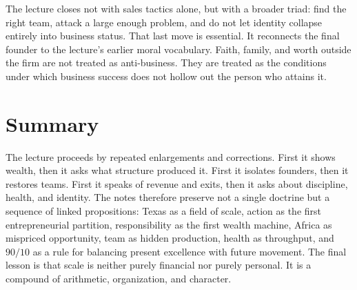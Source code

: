 The lecture closes not with sales tactics alone, but with a broader triad: find the right team, attack a large enough problem, and do not let identity collapse entirely into business status. That last move is essential. It reconnects the final founder to the lecture's earlier moral vocabulary. Faith, family, and worth outside the firm are not treated as anti-business. They are treated as the conditions under which business success does not hollow out the person who attains it.

\section{Summary}

The lecture proceeds by repeated enlargements and corrections. First it shows wealth, then it asks what structure produced it. First it isolates founders, then it restores teams. First it speaks of revenue and exits, then it asks about discipline, health, and identity. The notes therefore preserve not a single doctrine but a sequence of linked propositions: Texas as a field of scale, action as the first entrepreneurial partition, responsibility as the first wealth machine, Africa as mispriced opportunity, team as hidden production, health as throughput, and \(90/10\) as a rule for balancing present excellence with future movement. The final lesson is that scale is neither purely financial nor purely personal. It is a compound of arithmetic, organization, and character.